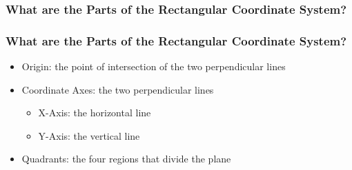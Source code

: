 \documentclass[14pt]{beamer}
\begin{document}
    \begin{frame}
    	\frametitle{What are the Parts of the Rectangular Coordinate System?}
    	
    	\pause {}
    	
    	\pause {}
    	
    	\pause {}
    	
    	\pause {}
    	
    	\pause {}
    	
    	\pause {}
    \end{frame}

    \begin{frame}
    	\frametitle{What are the Parts of the Rectangular Coordinate System?}
    	\begin{itemize}
    		\item Origin:  the point of intersection of the two perpendicular lines
    		\item Coordinate Axes: the two perpendicular lines
    		\begin{itemize}
    			\item X-Axis: the horizontal line
    			\item Y-Axis: the vertical line
    		\end{itemize}
    		\item Quadrants: the four regions that divide the plane
      	\end{itemize}
    \end{frame}
\end{document}
